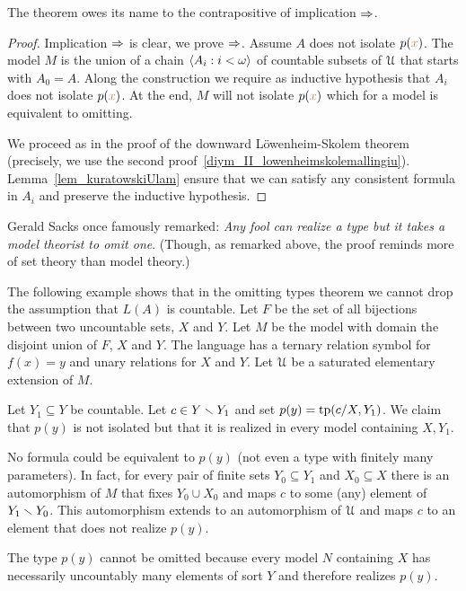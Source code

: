 \documentclass[creche.tex]{subfiles}
\begin{document}
The theorem owes its name to the contrapositive of implication $\Rightarrow$.

\begin{proof}
Implication $\Rightarrow$ is clear, we prove $\Rightarrow$.
Assume $A$ does not isolate $p({\color{brown} x})$.
The model $M$ is the union of a chain $\langle A_i:i<\omega\rangle$ of countable subsets of $\EuScript U$ that starts with $A_0=A$.
Along the construction we require as inductive hypothesis that $A_i$ does not isolate $p({\color{brown} x})$.
At the end, $M$ will not isolate $p({\color{brown} x})$ which for a model is equivalent to omitting.

We proceed as in the proof of the downward L\"owenheim-Skolem theorem (precisely, we use the second proof~\ref{diym_II_lowenheimskolemallingiu}).
Lemma~\ref{lem_kuratowskiUlam} ensure that we can satisfy any consistent formula in $A_i$ and preserve the inductive hypothesis.
\end{proof}

Gerald Sacks once famously remarked: \textit{Any fool can realize a type but it takes a model theorist to omit one}.
(Though, as remarked above, the proof reminds more of set theory than model theory.)



\begin{example}\label{ex_AK}
The following example shows that in the omitting types theorem we cannot drop the assumption that $L(A)$ is countable.
Let $F$ be the set of all bijections between two uncountable sets, $X$ and $Y$.
Let $M$ be the model with domain the disjoint union of $F$, $X$ and $Y$.
The language has a ternary relation symbol for $f(x)=y$ and unary relations for $X$ and $Y$.
Let $\EuScript U$ be a saturated elementary extension of $M$.

Let $Y_1\subseteq Y$ be countable.
Let $c\in Y\smallsetminus Y_1$ and set $p(y)={\rm tp}(c/X,Y_1)$.
We claim that $p(y)$ is not isolated but that it is realized in every model containing $X,Y_1$.

No formula could be equivalent to $p(y)$ (not even a type with finitely many parameters).
In fact, for every pair of finite sets $Y_0\subseteq Y_1$ and $X_0\subseteq X$ there is an automorphism of $M$ that fixes $Y_0\cup X_0$ and maps $c$ to some (any) element of $Y_1\smallsetminus Y_0$.
This automorphism extends to an automorphism of $\EuScript U$ and maps $c$ to an element that does not realize $p(y)$.
 
The type $p(y)$ cannot be omitted because every model $N$ containing  $X$ has necessarily uncountably many elements of sort $Y$ and therefore realizes $p(y)$.\QED
\end{example}
\end{document}

